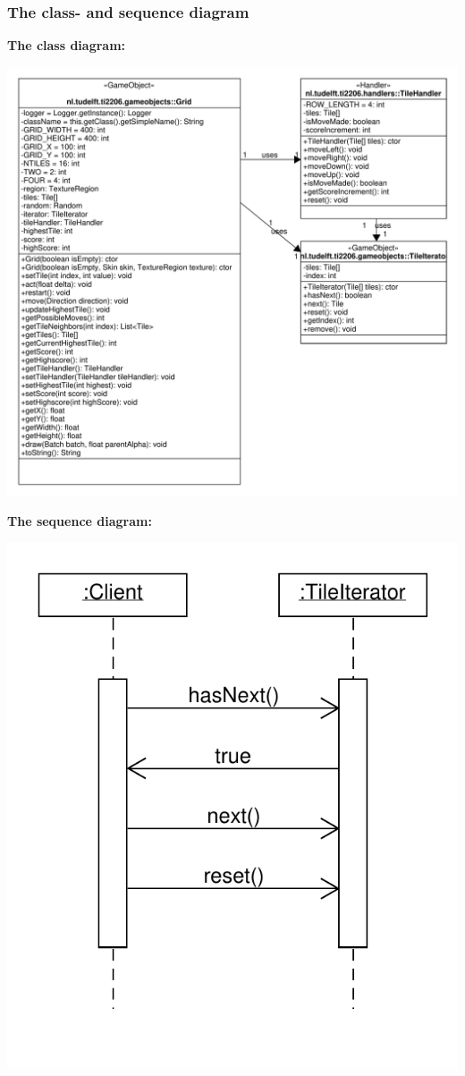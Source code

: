 \documentclass[a4paper,11pt,report]{scrartcl}
\begin{document}
\subsubsection{The class- and sequence diagram}
\textbf{The class diagram:}\\
\centerline{\includegraphics[scale=0.6]{sources/IteratorUML}}

\newpage\textbf{The sequence diagram:}\\
\centerline{\includegraphics[scale=1.0]{sources/IteratorSequence}}
\end{document}
